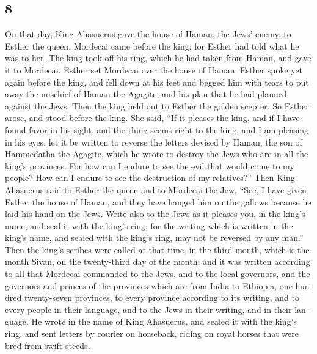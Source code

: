 \begin{paracol}{2}
\switchcolumn
\begin{otherlanguage}{english}

\hypertarget{section-15}{%
\section{8}\label{section-15}}

 On that day, King Ahasuerus gave the house of Haman, the
Jews' enemy, to Esther the queen. Mordecai came before the king; for
Esther had told what he was to her.  The king took off his
ring, which he had taken from Haman, and gave it to Mordecai. Esther set
Mordecai over the house of Haman.  Esther spoke yet again
before the king, and fell down at his feet and begged him with tears to
put away the mischief of Haman the Agagite, and his plan that he had
planned against the Jews.  Then the king held out to
Esther the golden scepter. So Esther arose, and stood before the king.
 She said, ``If it pleases the king, and if I have found
favor in his sight, and the thing seems right to the king, and I am
pleasing in his eyes, let it be written to reverse the letters devised
by Haman, the son of Hammedatha the Agagite, which he wrote to destroy
the Jews who are in all the king's provinces.  For how can
I endure to see the evil that would come to my people? How can I endure
to see the destruction of my relatives?''  Then King
Ahasuerus said to Esther the queen and to Mordecai the Jew, ``See, I
have given Esther the house of Haman, and they have hanged him on the
gallows because he laid his hand on the Jews.  Write also
to the Jews as it pleases you, in the king's name, and seal it with the
king's ring; for the writing which is written in the king's name, and
sealed with the king's ring, may not be reversed by any man.''
 Then the king's scribes were called at that time, in the
third month, which is the month Sivan, on the twenty-third day of the
month; and it was written according to all that Mordecai commanded to
the Jews, and to the local governors, and the governors and princes of
the provinces which are from India to Ethiopia, one hundred twenty-seven
provinces, to every province according to its writing, and to every
people in their language, and to the Jews in their writing, and in their
language.  He wrote in the name of King Ahasuerus, and
sealed it with the king's ring, and sent letters by courier on
horseback, riding on royal horses that were bred from swift steeds.

\end{otherlanguage}
\end{paracol}
